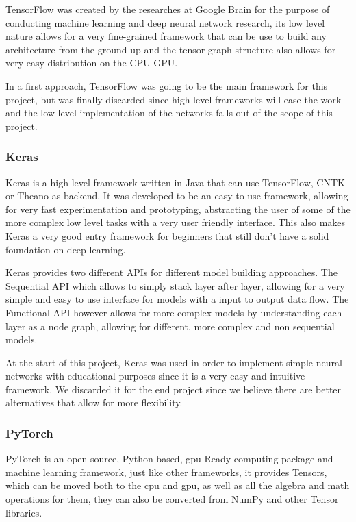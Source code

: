 TensorFlow was created by the researches at Google Brain for the purpose of conducting machine learning and deep neural network research, its low level nature allows for a very fine-grained framework that can be use to build any architecture from the ground up and the tensor-graph structure also allows for very easy distribution on the CPU-GPU.

In a first approach, TensorFlow was going to be the main framework for this project, but was finally discarded since high level frameworks will ease the work and the low level implementation of the networks falls out of the scope of this project.

\subsubsection{Keras}
Keras is a high level framework written in Java that can use TensorFlow, CNTK or Theano as backend. It was developed to be an easy to use framework, allowing for very fast experimentation and prototyping, abstracting the user of some of the more complex low level tasks with a very user friendly interface. This also makes Keras a very good entry framework for beginners that still don't have a solid foundation on deep learning.

Keras provides two different APIs for different model building approaches. The Sequential API which allows to simply stack layer after layer, allowing for a very simple and easy to use interface for models with a input to output data flow. The Functional API however allows for more complex models by understanding each layer as a node graph, allowing for different, more complex and non sequential models.

At the start of this project, Keras was used in order to implement simple neural networks with educational purposes since it is a very easy and intuitive framework. We discarded it for the end project since we believe there are better alternatives that allow for more flexibility.

\subsubsection{PyTorch}
PyTorch is an open source, Python-based, \gls{gpu}-Ready computing package and machine learning framework, just like other frameworks, it provides Tensors, which can be moved both to the \gls{cpu} and \gls{gpu}, as well as all the algebra and math operations for them, they can also be converted from NumPy and other Tensor libraries.

